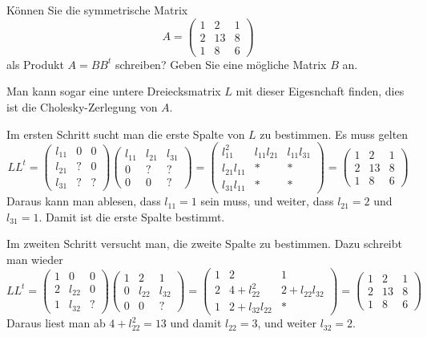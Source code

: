 Können Sie die symmetrische Matrix
\[
A=\begin{pmatrix}
1& 2&1\\
2&13&8\\
1& 8&6
\end{pmatrix}
\]
als Produkt $A=BB^t$ schreiben? Geben Sie eine mögliche Matrix $B$ an.


\begin{loesung}
Man kann sogar eine untere Dreiecksmatrix $L$ mit dieser Eigesnchaft finden,
dies ist die Cholesky-Zerlegung von $A$.

Im ersten Schritt sucht man die erste Spalte von $L$ zu bestimmen.
Es muss gelten
\[
LL^t=
\begin{pmatrix}
l_{11}&  0&  0\\
l_{21}&  ?&  0\\
l_{31}&  ?&  ?
\end{pmatrix}
\begin{pmatrix}
l_{11}&l_{21}&l_{31}\\
     0&     ?&     ?\\
     0&     0&     ?
\end{pmatrix}
=
\begin{pmatrix}
    l_{11}^2&l_{11}l_{21}&l_{11}l_{31}\\
l_{21}l_{11}&           *&           *\\
l_{31}l_{11}&           *&           *
\end{pmatrix}
=
\begin{pmatrix}
1& 2&1\\
2&13&8\\
1& 8&6
\end{pmatrix}
\]
Daraus kann man ablesen, dass $l_{11}=1$ sein muss, und weiter,
dass
$l_{21}=2$ und $l_{31}=1$. Damit ist die erste Spalte bestimmt.

Im zweiten Schritt versucht man, die zweite Spalte zu bestimmen.
Dazu schreibt man wieder
\[
LL^t
=
\begin{pmatrix}
1&     0&0\\
2&l_{22}&0\\
1&l_{32}&?
\end{pmatrix}
\begin{pmatrix}
1&     2&     1\\
0&l_{22}&l_{32}\\
0&     0&?
\end{pmatrix}
=
\begin{pmatrix}
1&2           &           1\\
2&4+l_{22}^2  &2+l_{22}l_{32}\\
1&2+l_{32}l_{22}&         *
\end{pmatrix}
=
\begin{pmatrix}
1& 2&1\\
2&13&8\\
1& 8&6
\end{pmatrix}
\]
Daraus liest man ab $4+l_{22}^2=13$ und damit $l_{22}=3$, und weiter
$l_{32}=2$.


\end{loesung}
